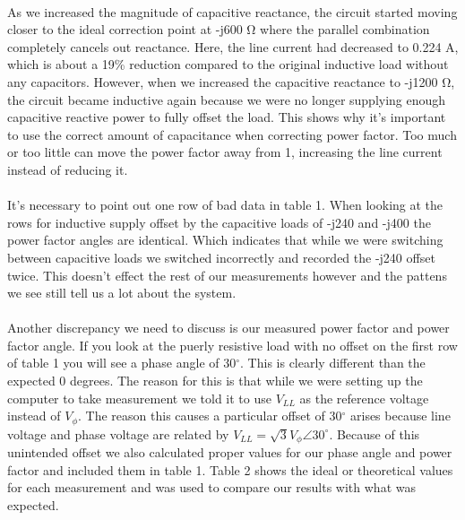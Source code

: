 \paragraph{}As we increased the magnitude of capacitive reactance,
the circuit started moving closer to the ideal
correction point at -j600 Ω where the parallel combination completely
cancels out reactance. Here, the line current had decreased to 0.224
A, which is about a 19\% reduction
compared to the original inductive load without any capacitors.
However, when we increased the capacitive
reactance to -j1200 Ω, the circuit became inductive again because we
were no longer supplying enough capacitive
reactive power to fully offset the load. This shows why it's
important to use the correct amount of capacitance
when correcting power factor. Too much or too little can move the
power factor away from 1, increasing the line
current instead of reducing it.

\paragraph{}It's necessary to point out one row of bad data in table
1. When looking at
the rows for inductive supply offset by the capacitive loads of -j240
and -j400 the
power factor angles are identical. Which indicates that while we were
switching between
capacitive loads we switched incorrectly and recorded the -j240
offset twice. This doesn't effect
the rest of our measurements however and the pattens we see still
tell us a lot about the system.

\paragraph{}Another discrepancy we need to discuss is our measured
power factor and power factor angle.
If you look at the puerly resistive load with no offset on the first
row of table 1 you will see a
phase angle of 30$^\circ$. This is clearly different than the
expected 0 degrees. The reason for this is
that while we were setting up the computer to take measurement we
told it to use $V_{LL}$ as the reference voltage instead
of $V_\phi$. The reason this causes a particular offset of 30$^\circ$
arises because line voltage and phase
voltage are related by $V_{LL}=\sqrt{3}V_{\phi}\angle30^\circ$.
Because of this unintended offset we
also calculated proper values for our phase angle and power factor
and included them in table 1. Table 2
shows the ideal or theoretical values for each measurement and was
used to compare our results with what
was expected.

